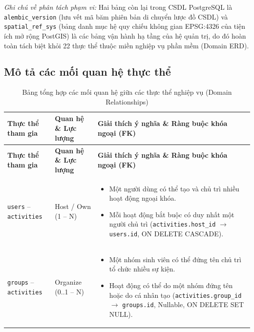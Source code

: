\noindent\textit{Ghi chú về phân tách phạm vi:} Hai bảng còn lại trong CSDL PostgreSQL là \texttt{alembic\_version} (lưu vết mã băm phiên bản di chuyển lược đồ CSDL) và \texttt{spatial\_ref\_sys} (bảng danh mục hệ quy chiếu không gian EPSG:4326 của tiện ích mở rộng PostGIS) là các bảng vận hành hạ tầng của hệ quản trị, do đó hoàn toàn tách biệt khỏi 22 thực thể thuộc miền nghiệp vụ phần mềm (Domain ERD).

\subsection{Mô tả các mối quan hệ thực thể}


\begin{longtable}{|p{}|p{}|p{}|}
    \caption{Bảng tổng hợp các mối quan hệ giữa các thực thể nghiệp vụ (Domain Relationships)} \label{tab:relationship_summary} \\
    
    \hline
    \textbf{Thực thể tham gia} & \textbf{Quan hệ \& Lực lượng} & \textbf{Giải thích ý nghĩa \& Ràng buộc khóa ngoại (FK)} \\ \hline
    \endfirsthead

    \hline
    \textbf{Thực thể tham gia} & \textbf{Quan hệ \& Lực lượng} & \textbf{Giải thích ý nghĩa \& Ràng buộc khóa ngoại (FK)} \\ \hline
    \endhead

    \hline
    \endfoot

    \hline
    \endlastfoot

    \texttt{users} -- \texttt{activities} & Host / Own \newline (1 -- N) & 
    \begin{itemize}
        \item Một người dùng có thể tạo và chủ trì nhiều hoạt động ngoại khóa.
        \item Mỗi hoạt động bắt buộc có duy nhất một người chủ trì (\texttt{activities.host\_id} $\rightarrow$ \texttt{users.id}, ON DELETE CASCADE).
    \end{itemize} \\ \hline

    \texttt{groups} -- \texttt{activities} & Organize \newline (0..1 -- N) & 
    \begin{itemize}
        \item Một nhóm sinh viên có thể đứng tên chủ trì tổ chức nhiều sự kiện.
        \item Hoạt động có thể do một nhóm đứng tên hoặc do cá nhân tạo (\texttt{activities.group\_id} $\rightarrow$ \texttt{groups.id}, Nullable, ON DELETE SET NULL).
    \end{itemize} \\ \hline


\end{longtable}
